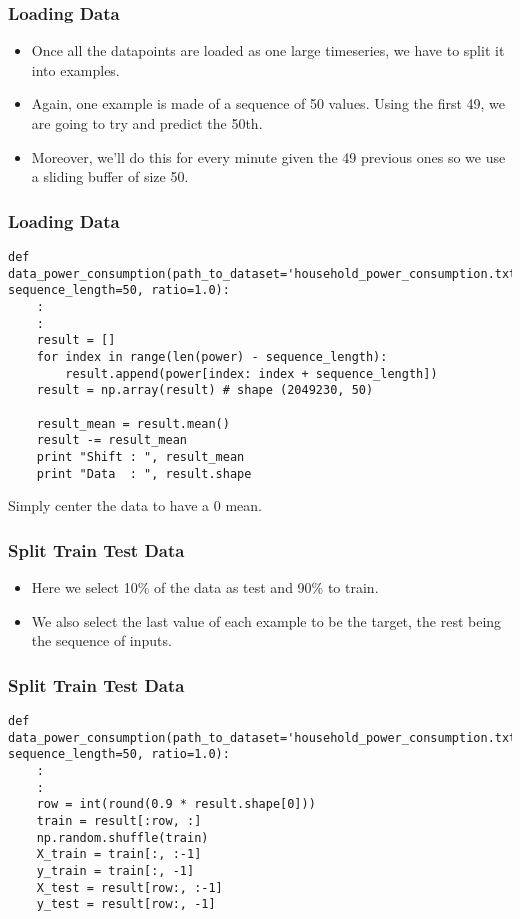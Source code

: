 \begin{frame}[fragile] \frametitle{Loading Data}
\begin{itemize}
\item Once all the datapoints are loaded as one large timeseries, we have to split it into examples. 
\item Again, one example is made of a sequence of 50 values. Using the first 49, we are going to try and predict the 50th.
\item Moreover, we'll do this for every minute given the 49 previous ones so we use a sliding buffer of size 50.
\end{itemize}

\end{frame}

\begin{frame}[fragile] \frametitle{Loading Data}

\begin{lstlisting}
def data_power_consumption(path_to_dataset='household_power_consumption.txt', sequence_length=50, ratio=1.0):
	:
	:
    result = []
    for index in range(len(power) - sequence_length):
        result.append(power[index: index + sequence_length])
    result = np.array(result) # shape (2049230, 50)	
    
    result_mean = result.mean()
    result -= result_mean
    print "Shift : ", result_mean
    print "Data  : ", result.shape    
\end{lstlisting}
Simply center the data to have a 0 mean.
\end{frame}

\begin{frame}[fragile] \frametitle{Split Train Test Data}
\begin{itemize}
\item Here we select 10\% of the data as test and 90\% to train. 
\item We also select the last value of each example to be the target, the rest being the sequence of inputs.
\end{itemize}
\end{frame}

\begin{frame}[fragile] \frametitle{Split Train Test Data}

\begin{lstlisting}
def data_power_consumption(path_to_dataset='household_power_consumption.txt', sequence_length=50, ratio=1.0):
	:
	:
    row = int(round(0.9 * result.shape[0]))
    train = result[:row, :]
    np.random.shuffle(train)
    X_train = train[:, :-1]
    y_train = train[:, -1]
    X_test = result[row:, :-1]
    y_test = result[row:, -1]
\end{lstlisting}
\end{frame}


